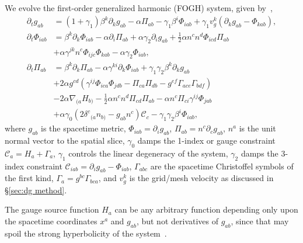 \documentclass[12pt]{caltech_thesis}
\begin{document}
\begin{bibunit}[unsrtnat]
We evolve the first-order generalized harmonic (FOGH) system, given
by~\cite{Lindblom:2005qh},
\begin{eqnarray}
  \label{eq:fosh gh metric evolution}
  \partial_t g_{ab}
  &=\left(1+\gamma_1\right)\beta^k\partial_k g_{ab}
    -\alpha \Pi_{ab}-\gamma_1\beta^i\Phi_{iab}
    +\gamma_1v^k_g\left(\partial_k g_{ab}-\Phi_{kab}\right), \\
  \label{eq:fosh gh metric derivative evolution}
  \partial_t\Phi_{iab}
  &=\beta^k\partial_k\Phi_{iab} - \alpha \partial_i\Pi_{ab}
    + \alpha \gamma_2\partial_ig_{ab}
    +\frac{1}{2}\alpha n^c n^d\Phi_{icd}\Pi_{ab} \nonumber \\
  &+ \alpha \gamma^{jk}n^c\Phi_{ijc}\Phi_{kab}
    -\alpha \gamma_2\Phi_{iab},\\
  \label{eq:fosh gh metric conjugate evolution}
  \partial_t\Pi_{ab}
  &=\beta^k\partial_k\Pi_{ab} - \alpha \gamma^{ki}\partial_k\Phi_{iab}
    + \gamma_1\gamma_2\beta^k\partial_kg_{ab} \nonumber \\
  &+2\alpha g^{cd}\left(\gamma^{ij}\Phi_{ica}\Phi_{jdb}
    - \Pi_{ca}\Pi_{db} - g^{ef}\Gamma_{ace}\Gamma_{bdf}\right) \nonumber \\
  &-2\alpha \nabla_{(a}H_{b)}
    - \frac{1}{2}\alpha n^c n^d\Pi_{cd}\Pi_{ab}
    - \alpha n^c \Pi_{ci}\gamma^{ij}\Phi_{jab} \nonumber \\
  &+\alpha \gamma_0\left(2\delta^c{}_{(a} n_{b)}
    - g_{ab}n^c\right)\mathcal{C}_c -\gamma_1\gamma_2 \beta^i\Phi_{iab},
\end{eqnarray}
where $g_{ab}$ is the spacetime metric, $\Phi_{iab}=\partial_i g_{ab}$,
$\Pi_{ab} = n^c\partial_cg_{ab}$, $n^a$ is the unit normal vector to the spatial
slice, $\gamma_0$ damps the 1-index or gauge constraint
$\mathcal{C}_a=H_a+\Gamma_a$, $\gamma_1$ controls the linear degeneracy of the
system, $\gamma_2$ damps the 3-index constraint
$\mathcal{C}_{iab}=\partial_i g_{ab}-\Phi_{iab}$, $\Gamma_{abc}$ are the
spacetime Christoffel symbols of the first kind, $\Gamma_a=g^{bc}\Gamma_{bca}$,
and $v^k_g$ is the grid/mesh velocity as discussed in \S\ref{sec:dg method}.

The gauge source function $H_a$ can be any arbitrary function depending only
upon the spacetime coordinates $x^a$ and $g_{ab}$, but not derivatives of
$g_{ab}$, since that may spoil the strong hyperbolicity of the
system~\cite{Lindblom:2007xw, Szilagyi:2009qz}.


\end{bibunit}
\end{document}
